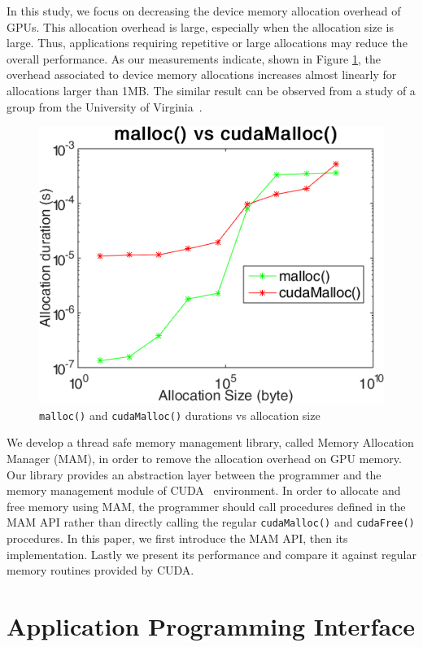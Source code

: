 \documentclass[conference]{IEEEtran}
\def\code#1{\texttt{#1}}
\begin{document}
In this study, we focus on decreasing the device memory allocation overhead of GPUs. This allocation overhead is large, especially when the allocation size is large. Thus, applications requiring repetitive or large allocations may reduce the overall performance. As our measurements indicate, shown in Figure \ref{fig:m-cm}, the overhead associated to device memory allocations increases almost linearly for allocations larger than 1MB.
The similar result can be observed from a study of a group from the University of Virginia~\cite{virginia}. 

\begin{figure}[h!]
\centering
  \includegraphics[width=0.8\linewidth]{malloc_vs_cuda-malloc.png}
  \caption{\code{malloc()} and \code{cudaMalloc()} durations vs allocation size}
  \label{fig:m-cm}
\end{figure}


We develop a thread safe memory management library, called Memory Allocation Manager (MAM), in order to remove the allocation overhead on GPU memory. Our library provides an abstraction layer between the programmer and the memory management module of CUDA~\cite{cuda} environment. In order to allocate and free memory using MAM, the programmer should call procedures defined in the MAM API rather than directly calling the regular \code{cudaMalloc()} and \code{cudaFree()} procedures. In this paper, we first introduce the MAM API, then its implementation. Lastly we present its performance and compare it against regular memory routines provided by CUDA. 


\section{Application Programming Interface}
\end{document}
